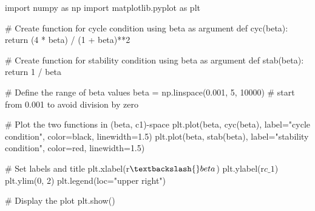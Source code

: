 \documentclass[
  letterpaper,
  DIV=11,
  numbers=noendperiod]{scrreprt}
\newenvironment{Shaded}{\begin{snugshade}}{\end{snugshade}}
\newcommand{\CommentTok}[1]{\textcolor[rgb]{0.37,0.37,0.37}{#1}}
\newcommand{\ControlFlowTok}[1]{\textcolor[rgb]{0.00,0.23,0.31}{#1}}
\newcommand{\DecValTok}[1]{\textcolor[rgb]{0.68,0.00,0.00}{#1}}
\newcommand{\FloatTok}[1]{\textcolor[rgb]{0.68,0.00,0.00}{#1}}
\newcommand{\ImportTok}[1]{\textcolor[rgb]{0.00,0.46,0.62}{#1}}
\newcommand{\KeywordTok}[1]{\textcolor[rgb]{0.00,0.23,0.31}{#1}}
\newcommand{\NormalTok}[1]{\textcolor[rgb]{0.00,0.23,0.31}{#1}}
\newcommand{\OperatorTok}[1]{\textcolor[rgb]{0.37,0.37,0.37}{#1}}
\newcommand{\StringTok}[1]{\textcolor[rgb]{0.13,0.47,0.30}{#1}}
\newcommand{\VerbatimStringTok}[1]{\textcolor[rgb]{0.13,0.47,0.30}{#1}}
\begin{document}
\begin{tcolorbox}[enhanced jigsaw, titlerule=0mm, breakable, bottomrule=.15mm, toprule=.15mm, colbacktitle=quarto-callout-note-color!10!white, rightrule=.15mm, toptitle=1mm, opacityback=0, left=2mm, coltitle=black, title=\textcolor{quarto-callout-note-color}{\faInfo}\hspace{0.5em}{Python code}, colframe=quarto-callout-note-color-frame, opacitybacktitle=0.6, leftrule=.75mm, bottomtitle=1mm, arc=.35mm, colback=white]

\begin{Shaded}
\begin{Highlighting}[]
\ImportTok{import}\NormalTok{ numpy }\ImportTok{as}\NormalTok{ np}
\ImportTok{import}\NormalTok{ matplotlib.pyplot }\ImportTok{as}\NormalTok{ plt}

\CommentTok{\# Create function for cycle condition using beta as argument}
\KeywordTok{def}\NormalTok{ cyc(beta):}
    \ControlFlowTok{return}\NormalTok{ (}\DecValTok{4} \OperatorTok{*}\NormalTok{ beta) }\OperatorTok{/}\NormalTok{ (}\DecValTok{1} \OperatorTok{+}\NormalTok{ beta)}\OperatorTok{**}\DecValTok{2}

\CommentTok{\# Create function for stability condition using beta as argument}
\KeywordTok{def}\NormalTok{ stab(beta):}
    \ControlFlowTok{return} \DecValTok{1} \OperatorTok{/}\NormalTok{ beta}

\CommentTok{\# Define the range of beta values}
\NormalTok{beta }\OperatorTok{=}\NormalTok{ np.linspace(}\FloatTok{0.001}\NormalTok{, }\DecValTok{5}\NormalTok{, }\DecValTok{10000}\NormalTok{)  }\CommentTok{\# start from 0.001 to avoid division by zero}

\CommentTok{\# Plot the two functions in (beta, c1){-}space}
\NormalTok{plt.plot(beta, cyc(beta), label}\OperatorTok{=}\StringTok{"cycle condition"}\NormalTok{, color}\OperatorTok{=}\StringTok{\textquotesingle{}black\textquotesingle{}}\NormalTok{, linewidth}\OperatorTok{=}\FloatTok{1.5}\NormalTok{)}
\NormalTok{plt.plot(beta, stab(beta), label}\OperatorTok{=}\StringTok{"stability condition"}\NormalTok{, color}\OperatorTok{=}\StringTok{\textquotesingle{}red\textquotesingle{}}\NormalTok{, linewidth}\OperatorTok{=}\FloatTok{1.5}\NormalTok{)}

\CommentTok{\# Set labels and title}
\NormalTok{plt.xlabel(}\VerbatimStringTok{r\textquotesingle{}$\textbackslash{}beta$\textquotesingle{}}\NormalTok{)}
\NormalTok{plt.ylabel(}\VerbatimStringTok{r\textquotesingle{}$c\_1$\textquotesingle{}}\NormalTok{)}
\NormalTok{plt.ylim(}\DecValTok{0}\NormalTok{, }\DecValTok{2}\NormalTok{)}
\NormalTok{plt.legend(loc}\OperatorTok{=}\StringTok{"upper right"}\NormalTok{)}

\CommentTok{\# Display the plot}
\NormalTok{plt.show()}
\end{Highlighting}
\end{Shaded}

\end{tcolorbox}
\end{document}
